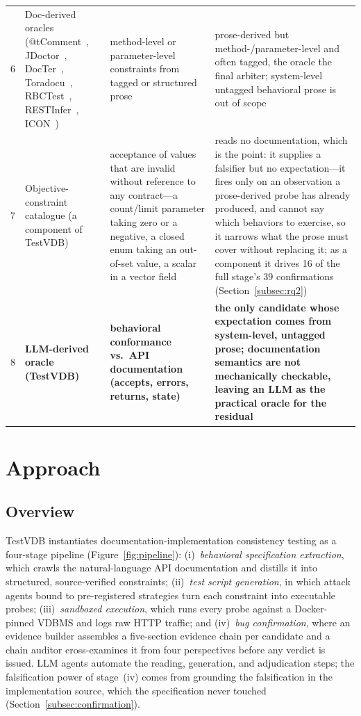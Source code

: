 \documentclass[acmsmall,screen,review,anonymous]{acmart}
\newcommand{\system}{TestVDB}
\begin{document}
\begin{table}[t]
\begin{tabular}{@{}rp{}p{}p{}@{}}
6 & Doc-derived oracles (@tComment~\cite{tcomment12}, JDoctor~\cite{jdoctor18}, DocTer~\cite{docter22}, Toradocu~\cite{toradocu16}, RBCTest~\cite{rbctest26}, RESTInfer~\cite{restinfer22}, ICON~\cite{icon16}) & method-level or parameter-level constraints from tagged or structured prose & prose-derived but method-/parameter-level and often tagged, the oracle the final arbiter; system-level untagged behavioral prose is out of scope \\
7 & Objective-constraint catalogue (a component of \system{}) & acceptance of values that are invalid without reference to any contract---a count/limit parameter taking zero or a negative, a closed enum taking an out-of-set value, a scalar in a vector field & reads no documentation, which is the point: it supplies a falsifier but no expectation---it fires only on an observation a prose-derived probe has already produced, and cannot say which behaviors to exercise, so it narrows what the prose must cover without replacing it; as a component it drives 16 of the full stage's 39 confirmations (Section~\ref{subsec:rq2}) \\
8 & \textbf{LLM-derived oracle (\system{})} & \textbf{behavioral conformance vs.\ API documentation (accepts, errors, returns, state)} & \textbf{the only candidate whose expectation comes from system-level, untagged prose; documentation semantics are not mechanically checkable, leaving an LLM as the practical oracle for the residual} \\
\bottomrule
\end{tabular}
\end{table}

\section{Approach}
\label{sec:approach}

\subsection{Overview}
\label{subsec:overview}

\system{} instantiates documentation-implementation consistency testing as a four-stage pipeline (Figure~\ref{fig:pipeline}): (i)~\emph{behavioral specification extraction}, which crawls the natural-language API documentation and distills it into structured, source-verified constraints; (ii)~\emph{test script generation}, in which attack agents bound to pre-registered strategies turn each constraint into executable probes; (iii)~\emph{sandboxed execution}, which runs every probe against a Docker-pinned VDBMS and logs raw HTTP traffic; and (iv)~\emph{bug confirmation}, where an evidence builder assembles a five-section evidence chain per candidate and a chain auditor cross-examines it from four perspectives before any verdict is issued. LLM agents automate the reading, generation, and adjudication steps; the falsification power of stage~(iv) comes from grounding the falsification in the implementation source, which the specification never touched (Section~\ref{subsec:confirmation}).
\end{document}
